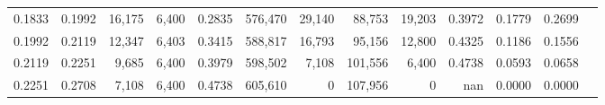 \begin{tabular}{rrrrrrrrrrrrr}
0.1833 & 0.1992 & 16,175 & 6,400 &                                     0.2835 & 576,470 &  29,140 &  88,753 &  19,203 & 0.3972 & 0.1779 & 0.2699 \\
0.1992 & 0.2119 & 12,347 & 6,403 &                                     0.3415 & 588,817 &  16,793 &  95,156 &  12,800 & 0.4325 & 0.1186 & 0.1556 \\
0.2119 & 0.2251 &  9,685 & 6,400 &                                     0.3979 & 598,502 &   7,108 & 101,556 &   6,400 & 0.4738 & 0.0593 & 0.0658 \\
0.2251 & 0.2708 &  7,108 & 6,400 &                                     0.4738 & 605,610 &       0 & 107,956 &       0 &    nan & 0.0000 & 0.0000 \\
\bottomrule
\end{tabular}
